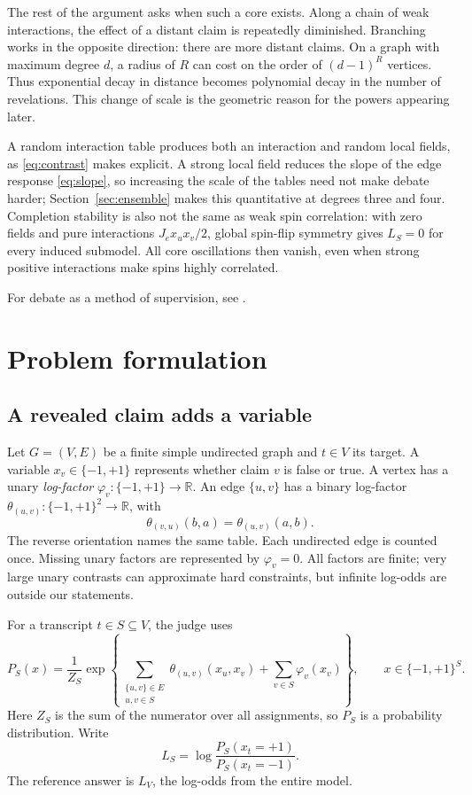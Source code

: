 \documentclass[11pt]{article}
\theoremstyle{definition}
\theoremstyle{remark}
\newcommand{\R}{\mathbb R}
\begin{document}
The rest of the argument asks when such a core exists. Along a chain of
weak interactions, the effect of a distant claim is repeatedly diminished.
Branching works in the opposite direction: there are more distant claims.
On a graph with maximum degree $d$, a radius of $R$ can cost on the order of
$(d-1)^R$ vertices. Thus exponential decay in distance becomes polynomial
decay in the number of revelations. This change of scale is the geometric
reason for the powers appearing later.

A random interaction table produces both an interaction and random local
fields, as \eqref{eq:contrast} makes explicit. A strong local field reduces
the slope of the edge response \eqref{eq:slope}, so increasing the scale of
the tables need not make debate harder; Section~\ref{sec:ensemble} makes this
quantitative at degrees three and four. Completion stability is also not the
same as weak spin correlation: with zero fields and pure interactions
$J_ex_ux_v/2$, global spin-flip symmetry gives $L_S=0$ for every induced
submodel. All core oscillations then vanish, even when strong positive
interactions make spins highly correlated.

For debate as a method of supervision, see \cite{irving,browncohen}.

\clearpage
\section{Problem formulation}
\label{sec:model}

\subsection{A revealed claim adds a variable}
Let $G=(V,E)$ be a finite simple undirected graph and $t\in V$ its target.
A variable $x_v\in\{-1,+1\}$ represents whether claim $v$ is false or true.
A vertex has a unary \emph{log-factor}
$\varphi_v:\{-1,+1\}\to\R$. An edge $\{u,v\}$ has a binary log-factor
$\theta_{(u,v)}:\{-1,+1\}^2\to\R$, with
\[
 \theta_{(v,u)}(b,a)=\theta_{(u,v)}(a,b).
\]
The reverse orientation names the same table. Each undirected edge is
counted once. Missing unary factors are represented by $\varphi_v=0$.
All factors are finite; very large unary contrasts can approximate hard
constraints, but infinite log-odds are outside our statements.

For a transcript $t\in S\subseteq V$, the judge uses
\begin{equation}
 P_S(x)=\frac1{Z_S}\exp\left\{
 \sum_{\substack{\{u,v\}\in E\\u,v\in S}}\theta_{(u,v)}(x_u,x_v)
 +\sum_{v\in S}\varphi_v(x_v)\right\},\qquad x\in\{-1,+1\}^S.
 \label{eq:model}
\end{equation}
Here $Z_S$ is the sum of the numerator over all assignments, so $P_S$ is a
probability distribution. Write
\begin{equation}
 L_S=\log\frac{P_S(x_t=+1)}{P_S(x_t=-1)}.
 \label{eq:logit}
\end{equation}
The reference answer is $L_V$, the log-odds from the entire model.
\end{document}
